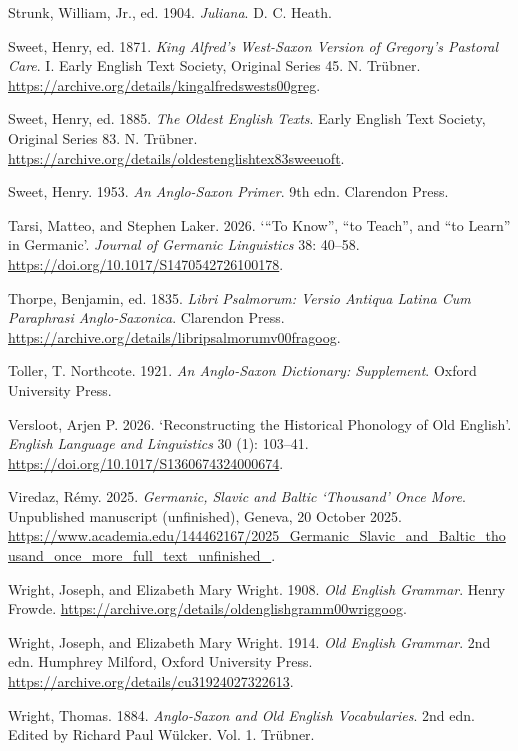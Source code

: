 \documentclass[
  british,
  a4paper,
]{article}
\newlength{\cslhangindent}
\newenvironment{CSLReferences}[2] %
 {\begin{list}{}{%
  \setlength{\itemindent}{0pt}
  \setlength{\leftmargin}{0pt}
  \setlength{\parsep}{0pt}
  \ifodd #1
   \setlength{\leftmargin}{\cslhangindent}
   \setlength{\itemindent}{-1\cslhangindent}
  \fi
  \setlength{\itemsep}{#2\baselineskip}}}
 {\end{list}}
\begin{document}
\begin{CSLReferences}{1}{1}
Strunk, William, Jr., ed. 1904. \emph{Juliana}. D. C. Heath.

Sweet, Henry, ed. 1871. \emph{King {Alfred}'s {West-Saxon} Version of
{Gregory}'s Pastoral Care}. I. Early English Text Society, Original
Series 45. N. Tr{ü}bner.
\url{https://archive.org/details/kingalfredswests00greg}.

Sweet, Henry, ed. 1885. \emph{The Oldest {English} Texts}. Early English
Text Society, Original Series 83. N. Tr{ü}bner.
\url{https://archive.org/details/oldestenglishtex83sweeuoft}.

Sweet, Henry. 1953. \emph{An {Anglo-Saxon} Primer}. 9th edn. Clarendon
Press.

Tarsi, Matteo, and Stephen Laker. 2026. {`{``To Know''}, {``to Teach''},
and {``to Learn''} in {Germanic}'}. \emph{Journal of Germanic
Linguistics} 38: 40--58.
\url{https://doi.org/10.1017/S1470542726100178}.

Thorpe, Benjamin, ed. 1835. \emph{Libri Psalmorum: Versio Antiqua Latina
Cum Paraphrasi Anglo-Saxonica}. Clarendon Press.
\url{https://archive.org/details/libripsalmorumv00fragoog}.

Toller, T. Northcote. 1921. \emph{An {Anglo-Saxon} Dictionary:
Supplement}. Oxford University Press.

Versloot, Arjen P. 2026. {`Reconstructing the Historical Phonology of
{Old} {English}'}. \emph{English Language and Linguistics} 30 (1):
103--41. \url{https://doi.org/10.1017/S1360674324000674}.

Viredaz, Rémy. 2025. \emph{{Germanic}, {Slavic} and {Baltic}
{`Thousand'} Once More}. Unpublished manuscript (unfinished), Geneva, 20
October 2025.
\url{https://www.academia.edu/144462167/2025_Germanic_Slavic_and_Baltic_thousand_once_more_full_text_unfinished_}.

Wright, Joseph, and Elizabeth Mary Wright. 1908. \emph{Old {English}
Grammar}. Henry Frowde.
\url{https://archive.org/details/oldenglishgramm00wriggoog}.

Wright, Joseph, and Elizabeth Mary Wright. 1914. \emph{Old {English}
Grammar}. 2nd edn. Humphrey Milford, Oxford University Press.
\url{https://archive.org/details/cu31924027322613}.

Wright, Thomas. 1884. \emph{Anglo-Saxon and Old English Vocabularies}.
2nd edn. Edited by Richard Paul Wülcker. Vol. 1. Tr{ü}bner.

\end{CSLReferences}
\end{document}
